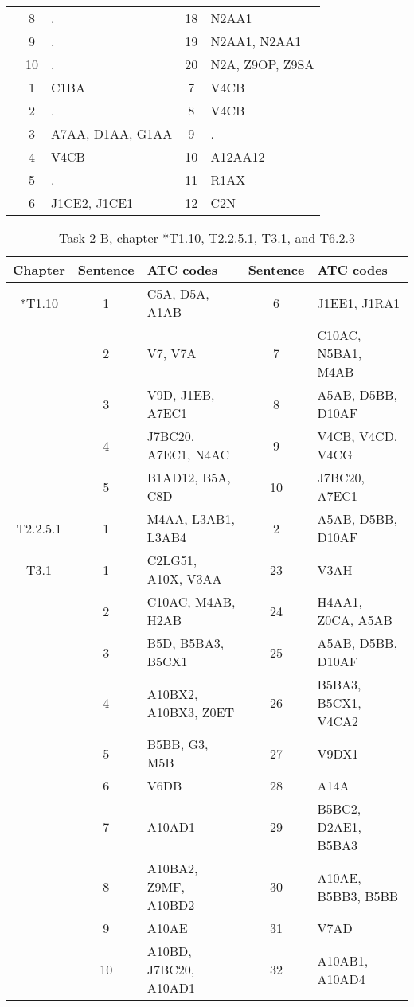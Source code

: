 \begin{table}[htbp]
\begin{tabular}{c c l c l}
	 & 8 & . & 18 & N2AA1 \\
	 & 9 & . & 19 & N2AA1, N2AA1 \\
	 & 10 & . & 20 & N2A, Z9OP, Z9SA \\
	\addlinespace
	8 & 1 & C1BA & 7 & V4CB \\
	 & 2 & . & 8 & V4CB \\
	 & 3 & A7AA, D1AA, G1AA & 9 & . \\
	 & 4 & V4CB & 10 & A12AA12 \\
	 & 5 & . & 11 & R1AX \\
	 & 6 & J1CE2, J1CE1 & 12 & C2N \\
	\bottomrule
\end{tabular}
\end{table}

\begin{table}[htbp] \footnotesize \center
\caption{Task 2 B, chapter *T1.10, T2.2.5.1, T3.1, and T6.2.3\label{tab:task2b}}
\begin{tabular}{c c l c l}
    \toprule
    Chapter & Sentence & ATC codes & Sentence & ATC codes \\
    \midrule
	*T1.10 & 1 & C5A, D5A, A1AB & 6 & J1EE1, J1RA1 \\
	 & 2 & V7, V7A & 7 & C10AC, N5BA1, M4AB \\
	 & 3 & V9D, J1EB, A7EC1 & 8 & A5AB, D5BB, D10AF \\
	 & 4 & J7BC20, A7EC1, N4AC & 9 & V4CB, V4CD, V4CG \\
	 & 5 & B1AD12, B5A, C8D & 10 & J7BC20, A7EC1 \\
	\addlinespace
	T2.2.5.1 & 1 & M4AA, L3AB1, L3AB4 & 2 & A5AB, D5BB, D10AF \\
	\addlinespace
	T3.1 & 1 & C2LG51, A10X, V3AA & 23 & V3AH \\
	 & 2 & C10AC, M4AB, H2AB & 24 & H4AA1, Z0CA, A5AB \\
	 & 3 & B5D, B5BA3, B5CX1 & 25 & A5AB, D5BB, D10AF \\
	 & 4 & A10BX2, A10BX3, Z0ET & 26 & B5BA3, B5CX1, V4CA2 \\
	 & 5 & B5BB, G3, M5B & 27 & V9DX1 \\
	 & 6 & V6DB & 28 & A14A \\
	 & 7 & A10AD1 & 29 & B5BC2, D2AE1, B5BA3 \\
	 & 8 & A10BA2, Z9MF, A10BD2 & 30 & A10AE, B5BB3, B5BB \\
	 & 9 & A10AE & 31 & V7AD \\
	 & 10 & A10BD, J7BC20, A10AD1 & 32 & A10AB1, A10AD4 \\

\end{tabular}
\end{table}
